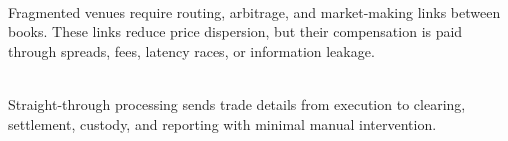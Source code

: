 \begin{mechanism} \\
Fragmented venues require routing, arbitrage, and market-making links between books. These links reduce price dispersion, but their compensation is paid through spreads, fees, latency races, or information leakage.
\end{mechanism}

\begin{practitionernote} \\
Straight-through processing sends trade details from execution to clearing, settlement, custody, and reporting with minimal manual intervention.
\end{practitionernote}
